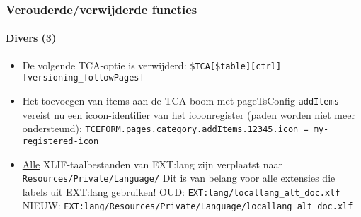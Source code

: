 \begin{frame}[fragile]
	\frametitle{Verouderde/verwijderde functies}
	\framesubtitle{Divers (3)}


	\begin{itemize}

		\item De volgende TCA-optie is verwijderd:\newline
			\texttt{\$TCA[\$table][ctrl][versioning\_followPages]}

		\item Het toevoegen van items aan de TCA-boom met pageTsConfig \texttt{addItems} vereist nu een icoon-identifier
			van het icoonregister (paden worden niet meer ondersteund):\newline
			\smaller
				\texttt{TCEFORM.pages.category.addItems.12345.icon = my-registered-icon}
			\normalsize

		\item \underline{Alle} XLIF-taalbestanden van EXT:lang zijn verplaatst naar\newline
			\texttt{Resources/Private/Language/}\newline
			Dit is van belang voor alle extensies die labels uit EXT:lang gebruiken!\newline
			\smaller
				OUD: \texttt{EXT:lang/locallang\_alt\_doc.xlf}\newline
				NIEUW: \texttt{EXT:lang/Resources/Private/Language/locallang\_alt\_doc.xlf}
			\normalsize

	\end{itemize}

\end{frame}







